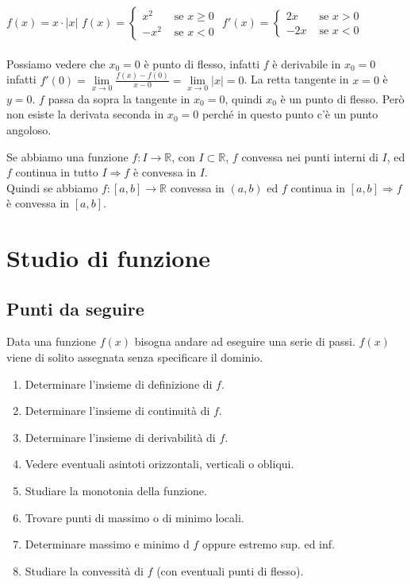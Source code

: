 \begin{example}
$f(x) = x \cdot |x|$\hspace{.3cm} $f(x) = \begin{cases}x^2 & \text{ se } x \geq 0\\ -x^2 & \text{ se } x<0\end{cases}$\hspace{.3cm} $f'(x) = \begin{cases}2x & \text{ se } x>0 \\ -2x & \text{ se } x<0\end{cases}$\\\\
Possiamo vedere che $x_0 = 0$ è punto di flesso, infatti $f$ è derivabile in $x_0 = 0$ infatti $f'(0) = \lim\limits_{x\to 0}\frac{f(x) - f(0)}{x-0} = \lim\limits_{x\to 0}|x| = 0$.
La retta tangente in $x=0$ è $y=0$. $f$ passa da sopra la tangente in $x_0 = 0$, quindi $x_0$ è un punto di flesso. Però non esiste la derivata seconda in $x_0 = 0$ perché in questo punto c'è un punto angoloso.
\end{example}

\begin{observation}
Se abbiamo una funzione $f: I \to \mathbb{R}$, con $I \subset \mathbb{R}$, $f$ convessa nei punti interni di $I$, ed $f$ continua in tutto $I \Longrightarrow f$ è convessa in $I$.\\
Quindi se abbiamo $f:[a,b] \to \mathbb{R}$ convessa in $(a,b)$ ed $f$ continua in $[a,b] \Longrightarrow f$ è convessa in $[a,b]$.
\end{observation}

\newpage
\section{Studio di funzione}
\subsection{Punti da seguire}
Data una funzione $f(x)$ bisogna andare ad eseguire una serie di passi. $f(x)$ viene di solito assegnata senza specificare il dominio.
\begin{enumerate}
    \item Determinare l'insieme di definizione di $f$.
    \item Determinare l'insieme di continuità di $f$.
    \item Determinare l'insieme di derivabilità di $f$.
    \item Vedere eventuali asintoti orizzontali, verticali o obliqui.
    \item Studiare la monotonia della funzione.
    \item Trovare punti di massimo o di minimo locali.
    \item Determinare massimo e minimo d $f$ oppure estremo sup. ed inf.
    \item Studiare la convessità di $f$ (con eventuali punti di flesso).
\end{enumerate}


